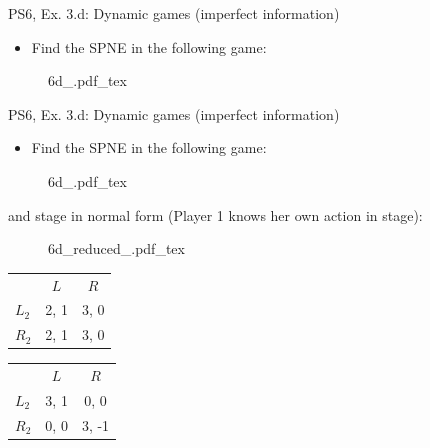 \begin{frame}{PS6, Ex. 3.d: Dynamic games (imperfect information)}
    \begin{itemize}
      \item[(d)] Find the SPNE in the following game:
    \end{itemize}
    \begin{figure}[!h]
      \center
      \def\svgwidth{.8\columnwidth}
      {6d_.pdf_tex}
    \end{figure}
    \vfill\null
\end{frame}
\begin{frame}{PS6, Ex. 3.d: Dynamic games (imperfect information)}
    \begin{itemize}
      \item[(d)] Find the SPNE in the following game:
    \end{itemize}
    \vspace{-4pt}
    \begin{figure}[!h]
      \center
      \def\svgwidth{.8\columnwidth}
      {6d_.pdf_tex}
    \end{figure}
    \vspace{-4pt}
     and  stage in normal form (Player 1 knows her own action in  stage):
    \vspace{-4pt}
    \begin{figure}[!h]
      \center
      \def\svgwidth{.25\columnwidth}
      {6d_reduced_.pdf_tex}
    \end{figure}
    \vspace{-9pt}
    \begin{table}
      \begin{tabular}{l|c|c|}
        \multicolumn{1}{c}{} & \multicolumn{1}{c}{$L$} & \multicolumn{1}{c}{$R$} \\\cline{2-3}
        $L_2$ & 2, 1 & 3, 0 \\\cline{2-3}
        $R_2$ & 2, 1 & 3, 0 \\\cline{2-3}
      \end{tabular}
      \enskip
      \begin{tabular}{l|c|c|}
        \multicolumn{1}{c}{} & \multicolumn{1}{c}{$L$} & \multicolumn{1}{c}{$R$} \\\cline{2-3}
        $L_2$ & 3, 1 & 0, 0 \\\cline{2-3}
        $R_2$ & 0, 0 & 3, -1 \\\cline{2-3}
      \end{tabular}
    \end{table}
    \vfill\null
\end{frame}
